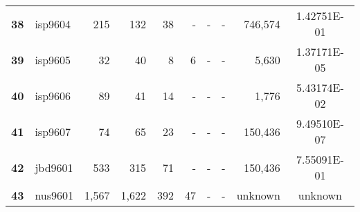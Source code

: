 \begin{longtable}{@{}llrrrrrrrc@{}}
\textbf{38} & isp9604  & 215                  & 132      & 38      & -    & -    & -     & 746,574              & 1.42751E-01 \\
\textbf{39} & isp9605  & 32                   & 40       & 8       & 6    & -    & -     & 5,630                & 1.37171E-05 \\
\textbf{40} & isp9606  & 89                   & 41       & 14      & -    & -    & -     & 1,776                & 5.43174E-02 \\
\textbf{41} & isp9607  & 74                   & 65       & 23      & -    & -    & -     & 150,436              & 9.49510E-07 \\
\textbf{42} & jbd9601  & 533                  & 315      & 71      & -    & -    & -     & 150,436              & 7.55091E-01 \\
\textbf{43} & nus9601  & 1,567                & 1,622    & 392     & 47   & -    & -     & unknown              & unknown     \\* \bottomrule
\end{longtable}